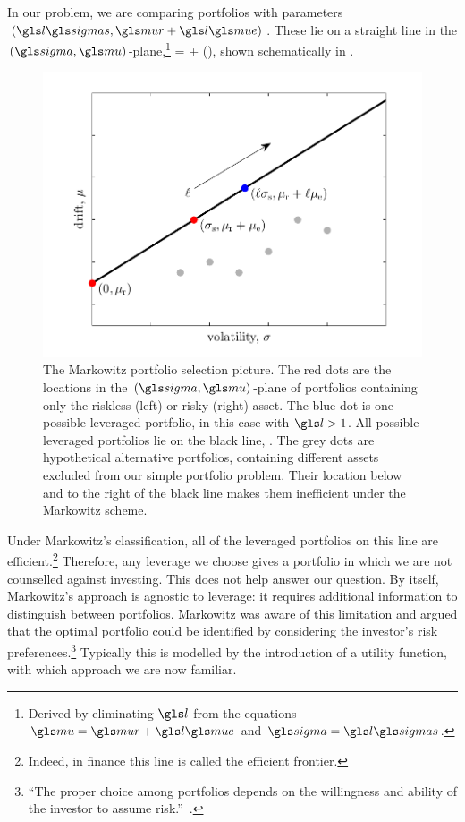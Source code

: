 In our problem, we are comparing portfolios with parameters $(\l\sigmas, \mur+\l\mue)$. These lie on a straight line in the $(\gsigma, \gmu)$-plane,\footnote{Derived by eliminating $\l$ from the equations $\gmu=\mur+\l\mue$ and $\gsigma=\l\sigmas$.}
\be
\gmu = \mur + \left(\frac{\mue}{\sigmas}\right)\gsigma,
\ee
shown schematically in .
\begin{figure}
\centering
\includegraphics[width=\textwidth]{./chapter_4/figs/markowitz.pdf}
\caption{The Markowitz portfolio selection picture. The red dots are the locations in the $(\gsigma,\gmu)$-plane of portfolios containing only the riskless (left) or risky (right) asset. The blue dot is one possible leveraged portfolio, in this case with $\l>1$. All possible leveraged portfolios lie on the black line, . The grey dots are hypothetical alternative portfolios, containing different assets excluded from our simple portfolio problem. Their location below and to the right of the black line makes them inefficient under the Markowitz scheme.}
\end{figure}
Under Markowitz's classification, all of the leveraged portfolios on this line are efficient.\footnote{Indeed, in finance this line is called the efficient frontier.} Therefore, any leverage we choose gives a portfolio in which we are not counselled against investing. This does not help answer our question. By itself, Markowitz's approach is agnostic to leverage: it requires additional information to distinguish between portfolios. Markowitz was aware of this limitation and argued that the optimal portfolio could be identified by considering the investor's risk preferences.\footnote{``The proper choice among portfolios depends on the willingness and ability of the investor to assume risk.''~\cite{Markowitz1991}.} Typically this is modelled by the introduction of a utility function, with which approach we are now familiar.

